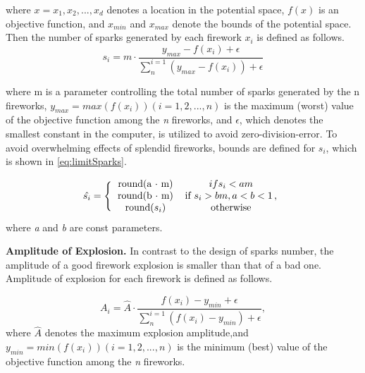 \documentclass[11pt, a4paper]{report}
\begin{document}
	where $ x = x_{1}, x_{2},...,x_{d} $ denotes a location in the potential space, $ f(x) $ is an
	objective function, and $ x_{min} $ and $ x_{max}  $ denote the bounds of the potential space.
	Then the number of sparks generated by each firework $ x_{i} $ is defined as follows.
	\begin{equation}
	\label{eq:noOfSpark}
		s_{i} = m \cdot \dfrac{y_{max} - f(x_{i}) + \epsilon }{\sum_{n}^{i = 1} (y_{max} - f(x_{i})) + \epsilon}
	\end{equation}
	
	where m is a parameter controlling the total number of sparks generated by
	the n fireworks, $ y_{max} = max(f(x_{i})) (i = 1, 2,...,n) $ is the maximum (worst)
	value of the objective function among the \textit{n} fireworks, and $ \epsilon $, which denotes the
	smallest constant in the computer, is utilized to avoid zero-division-error.
	To avoid overwhelming effects of splendid fireworks, bounds are defined for
	$ s_{i} $, which is shown in \ref{eq:limitSparks}.
	
	\begin{equation}
	\label{eq:limitSparks}
		\hat{s_{i}} =  \Bigg\{
		\begin{tabular}{cc}
		round(a $ \cdot $ m) & $ if s_{i} < am $ \\
		round(b $ \cdot $ m) & if $ s_{i}  > bm , a < b < 1 \,$,\\
		round($ s_{i} $) & otherwise \\
		\end{tabular}
	\end{equation}
	where \textit{a} and \textit{b} are const parameters.

\newpage
	
	\textbf{Amplitude of Explosion.} In contrast to the design of sparks number, the amplitude
	of a good firework explosion is smaller than that of a bad one. Amplitude
	of explosion for each firework is defined as follows.
	
	\begin{equation}
		A_{i} = \hat{A} \cdot \frac{f(x_{i}) - y_{min} + \epsilon}{\sum_{n}^{i = 1}(f(x_{i}) - y_{min}) + \epsilon} ,
	\end{equation}
	where $ \hat{A} $ denotes the maximum explosion amplitude,and $ y_{min} = min(f(x_{i})) (i =
	1, 2,...,n) $ is the minimum (best) value of the objective function among the \textit{n}
	fireworks.
	
\end{document}
